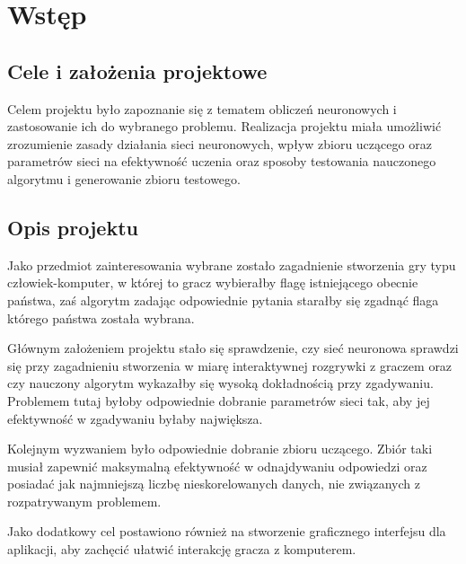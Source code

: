\chapter{Wstęp}

\section{Cele i założenia projektowe}

Celem projektu było zapoznanie się z tematem obliczeń neuronowych i zastosowanie ich do wybranego problemu. Realizacja projektu miała umożliwić zrozumienie zasady działania sieci neuronowych, wpływ zbioru uczącego oraz parametrów sieci na efektywność uczenia oraz sposoby testowania nauczonego algorytmu i generowanie zbioru testowego.

\section{Opis projektu}

Jako przedmiot zainteresowania wybrane zostało zagadnienie stworzenia gry typu człowiek-komputer, w której to gracz wybierałby flagę istniejącego obecnie państwa, zaś algorytm zadając odpowiednie pytania starałby się zgadnąć flaga którego państwa została wybrana.

Głównym założeniem projektu stało się sprawdzenie, czy sieć neuronowa sprawdzi się przy zagadnieniu stworzenia w miarę interaktywnej rozgrywki z graczem oraz czy nauczony algorytm wykazałby się wysoką dokładnością przy zgadywaniu. Problemem tutaj byłoby odpowiednie dobranie parametrów sieci tak, aby jej efektywność w zgadywaniu byłaby największa.

Kolejnym wyzwaniem było odpowiednie dobranie zbioru uczącego. Zbiór taki musiał zapewnić maksymalną efektywność w odnajdywaniu odpowiedzi oraz posiadać jak najmniejszą liczbę nieskorelowanych danych, nie związanych z rozpatrywanym problemem.

Jako dodatkowy cel postawiono również na stworzenie graficznego interfejsu dla aplikacji, aby zachęcić ułatwić interakcję gracza z komputerem.